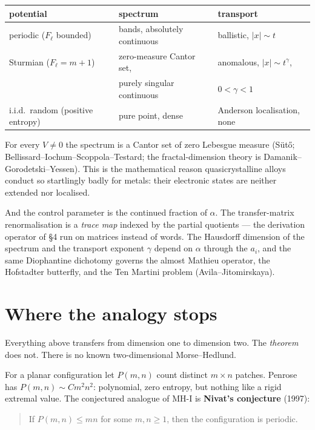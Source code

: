 \documentclass[11pt,a4paper]{article}
\theoremstyle{definition}
\theoremstyle{plain}
\begin{document}
\begin{center}
\begin{tabular}{lll}
\toprule
potential & spectrum & transport \\
\midrule
periodic ($F_\ell$ bounded) & bands, absolutely continuous & ballistic, $|x| \sim t$ \\
\textcolor{cA}{Sturmian ($F_\ell = m+1$)} & \textcolor{cA}{zero-measure Cantor set,} & \textcolor{cA}{anomalous, $|x| \sim t^\gamma$,} \\
 & \textcolor{cA}{purely singular continuous} & \textcolor{cA}{$0 < \gamma < 1$} \\
i.i.d.\ random (positive entropy) & pure point, dense & Anderson localisation, none \\
\bottomrule
\end{tabular}
\end{center}

For every $V \neq 0$ the spectrum is a Cantor set of zero Lebesgue measure
(S\"ut\H{o}; Bellissard--Iochum--Scoppola--Testard; the fractal-dimension theory
is Damanik--Gorodetski--Yessen). This is the mathematical reason quasicrystalline
alloys conduct so startlingly badly for metals: their electronic states are
neither extended nor localised.

And the control parameter is the continued fraction of $\alpha$. The
transfer-matrix renormalisation is a \emph{trace map} indexed by the partial
quotients --- the derivation operator of \S4 run on matrices instead of words.
The Hausdorff dimension of the spectrum and the transport exponent $\gamma$
depend on $\alpha$ through the $a_i$, and the same Diophantine dichotomy
governs the almost Mathieu operator, the Hofstadter butterfly, and the Ten
Martini problem (Avila--Jitomirskaya).

\section{Where the analogy stops}

Everything above transfers from dimension one to dimension two. The
\emph{theorem} does not. There is no known two-dimensional Morse--Hedlund.

For a planar configuration let $P(m,n)$ count distinct $m \times n$ patches.
Penrose has $P(m,n) \sim C m^2 n^2$: polynomial, zero entropy, but nothing like
a rigid extremal value. The conjectured analogue of MH-I is \textbf{Nivat's
conjecture} (1997):

\begin{quote}
If $P(m,n) \leq mn$ for some $m, n \geq 1$, then the configuration is periodic.
\end{quote}
\end{document}
